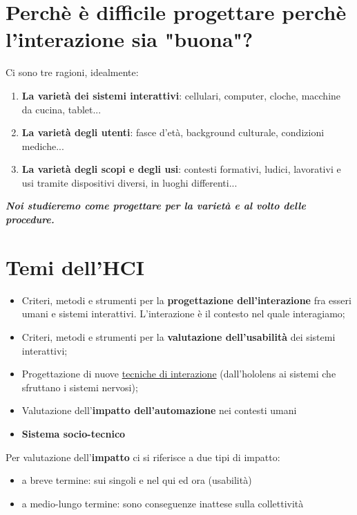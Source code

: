 \documentclass[11pt,a4paper]{book}
\begin{document}
\section{Perchè è difficile progettare perchè l'interazione sia "buona"?}
Ci sono tre ragioni, idealmente:
\begin{enumerate}
	\item \textbf{La varietà dei sistemi interattivi}: cellulari, computer, cloche, macchine da cucina, tablet...
	\item \textbf{La varietà degli utenti}: fasce d'età, background culturale, condizioni mediche...
	\item \textbf{La varietà degli scopi e degli usi}: contesti formativi, ludici, lavorativi e usi tramite dispositivi diversi, in luoghi differenti...
\end{enumerate}

\begin{center}
\textbf{\textit{Noi studieremo come progettare per la varietà e al volto delle procedure.}}
\end{center}

\section{Temi dell'HCI}
\begin{itemize}
	\item Criteri, metodi e strumenti per la \textbf{progettazione dell'interazione} fra esseri umani e sistemi interattivi. L'interazione è il contesto nel quale interagiamo;
	\item Criteri, metodi e strumenti per la \textbf{valutazione dell'usabilità} dei sistemi interattivi;
	\item Progettazione di nuove \underline{tecniche di interazione} (dall'hololens ai sistemi che sfruttano i sistemi nervosi);
	\item Valutazione dell'\textbf{impatto dell'automazione} nei contesti umani
	\item \textbf{Sistema socio-tecnico}
\end{itemize}
Per valutazione dell'\textbf{impatto} ci si riferisce a due tipi di impatto:
\begin{itemize}
	\item a breve termine: sui singoli e nel qui ed ora (usabilità)
	\item a medio-lungo termine: sono conseguenze inattese sulla collettività
\end{itemize}
\end{document}
